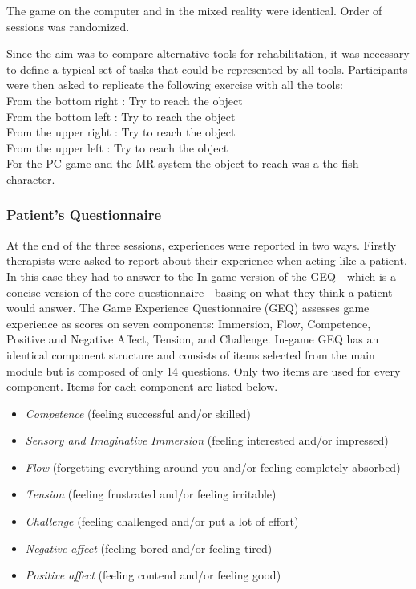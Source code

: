 \documentclass[preprint,authoryear,12pt]{elsarticle}
\begin{document}
The game on the computer and in the mixed reality were identical. Order of sessions was randomized. 
\par \medskip

Since the aim was to compare alternative tools for rehabilitation, it was necessary to define a typical set of tasks that could be represented by all tools. Participants were then asked to replicate the following exercise with all the tools:\\
From the bottom right : Try to reach the object\\
From the bottom left  : Try to reach the object\\
From the upper right  : Try to reach the object\\
From the upper left : Try to reach the object\\
For the PC game and the MR system the object to reach was a the fish character. 

\par \medskip

\subsubsection{Patient's Questionnaire}
At the end of the three sessions, experiences were reported in two ways. Firstly  therapists were asked to  report about their experience when acting like a patient. In this case they had to   answer to the In-game version of the GEQ \citep{GEQ07} -  which is a concise version of the core questionnaire - basing on  what they think a patient would answer. The Game Experience Questionnaire (GEQ)  assesses game experience as scores on seven components: Immersion, Flow, Competence, Positive and Negative Affect, Tension, and Challenge.  In-game GEQ has an identical component structure and consists of items selected from the main module but is composed of only 14 questions. Only two items are used for every component. Items for each component are listed below. 

\begin{itemize}
\item \emph{Competence} (feeling successful and/or skilled)
\item \emph{Sensory and Imaginative Immersion} (feeling interested and/or impressed)
\item  \emph{Flow} (forgetting everything around you and/or feeling completely absorbed)
\item \emph{Tension} (feeling frustrated and/or feeling irritable)
\item \emph{Challenge} (feeling challenged and/or put a lot of effort)
\item \emph{Negative affect} (feeling bored and/or feeling tired)
\item \emph{Positive affect} (feeling contend and/or feeling good)
\end{itemize}
\end{document}

